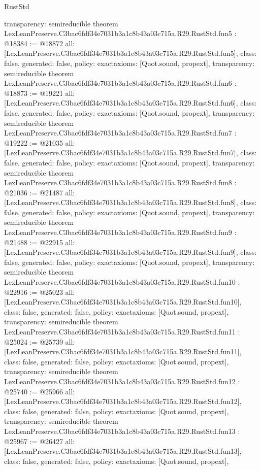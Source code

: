 \begin{lexlean}{RustStd}
\begin{coremodule}
{  transparency: semireducible
}
theorem LexLeanPreserve.C3bac6fdf34e7031b3a1c8b43a03c715a.R29.RustStd.fun5 : @18384 := @18872 {
  all: [LexLeanPreserve.C3bac6fdf34e7031b3a1c8b43a03c715a.R29.RustStd.fun5],
  class: false,
  generated: false,
  policy: exact{axioms: [Quot.sound, propext]},
  transparency: semireducible
}
theorem LexLeanPreserve.C3bac6fdf34e7031b3a1c8b43a03c715a.R29.RustStd.fun6 : @18873 := @19221 {
  all: [LexLeanPreserve.C3bac6fdf34e7031b3a1c8b43a03c715a.R29.RustStd.fun6],
  class: false,
  generated: false,
  policy: exact{axioms: [Quot.sound, propext]},
  transparency: semireducible
}
theorem LexLeanPreserve.C3bac6fdf34e7031b3a1c8b43a03c715a.R29.RustStd.fun7 : @19222 := @21035 {
  all: [LexLeanPreserve.C3bac6fdf34e7031b3a1c8b43a03c715a.R29.RustStd.fun7],
  class: false,
  generated: false,
  policy: exact{axioms: [Quot.sound, propext]},
  transparency: semireducible
}
theorem LexLeanPreserve.C3bac6fdf34e7031b3a1c8b43a03c715a.R29.RustStd.fun8 : @21036 := @21487 {
  all: [LexLeanPreserve.C3bac6fdf34e7031b3a1c8b43a03c715a.R29.RustStd.fun8],
  class: false,
  generated: false,
  policy: exact{axioms: [Quot.sound, propext]},
  transparency: semireducible
}
theorem LexLeanPreserve.C3bac6fdf34e7031b3a1c8b43a03c715a.R29.RustStd.fun9 : @21488 := @22915 {
  all: [LexLeanPreserve.C3bac6fdf34e7031b3a1c8b43a03c715a.R29.RustStd.fun9],
  class: false,
  generated: false,
  policy: exact{axioms: [Quot.sound, propext]},
  transparency: semireducible
}
theorem LexLeanPreserve.C3bac6fdf34e7031b3a1c8b43a03c715a.R29.RustStd.fun10 : @22916 := @25023 {
  all: [LexLeanPreserve.C3bac6fdf34e7031b3a1c8b43a03c715a.R29.RustStd.fun10],
  class: false,
  generated: false,
  policy: exact{axioms: [Quot.sound, propext]},
  transparency: semireducible
}
theorem LexLeanPreserve.C3bac6fdf34e7031b3a1c8b43a03c715a.R29.RustStd.fun11 : @25024 := @25739 {
  all: [LexLeanPreserve.C3bac6fdf34e7031b3a1c8b43a03c715a.R29.RustStd.fun11],
  class: false,
  generated: false,
  policy: exact{axioms: [Quot.sound, propext]},
  transparency: semireducible
}
theorem LexLeanPreserve.C3bac6fdf34e7031b3a1c8b43a03c715a.R29.RustStd.fun12 : @25740 := @25966 {
  all: [LexLeanPreserve.C3bac6fdf34e7031b3a1c8b43a03c715a.R29.RustStd.fun12],
  class: false,
  generated: false,
  policy: exact{axioms: [Quot.sound, propext]},
  transparency: semireducible
}
theorem LexLeanPreserve.C3bac6fdf34e7031b3a1c8b43a03c715a.R29.RustStd.fun13 : @25967 := @26427 {
  all: [LexLeanPreserve.C3bac6fdf34e7031b3a1c8b43a03c715a.R29.RustStd.fun13],
  class: false,
  generated: false,
  policy: exact{axioms: [Quot.sound, propext]},
}
\end{coremodule}
\end{lexlean}
